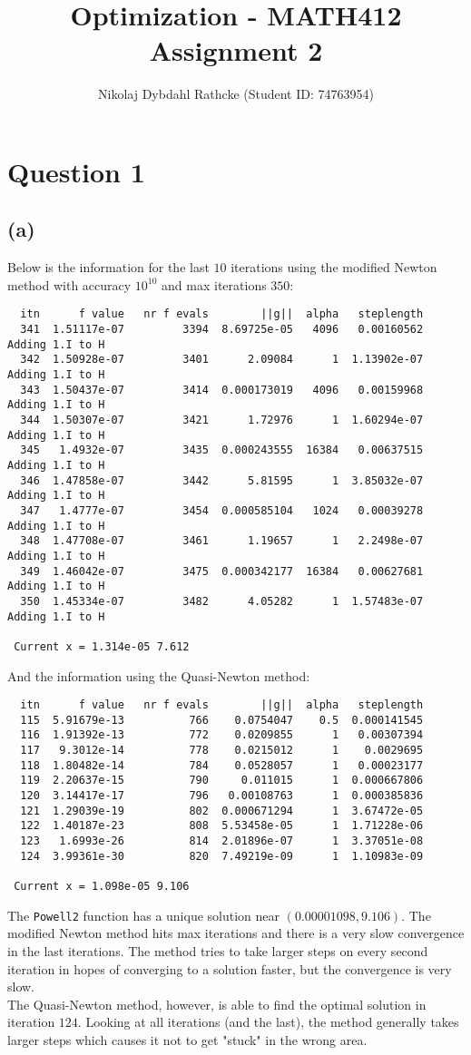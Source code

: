 \documentclass[a4paper, fleqn]{article}
\author{Nikolaj Dybdahl Rathcke (Student ID: 74763954)}
\title{Optimization - MATH412 \\ Assignment 2}
\begin{document}
\maketitle

\section{Question 1}
\subsection{(a)}
Below is the information for the last $10$ iterations using the modified Newton method
with accuracy $10^{10}$ and max iterations $350$:
\begin{verbatim}
  itn      f value   nr f evals        ||g||  alpha   steplength
  341  1.51117e-07         3394  8.69725e-05   4096   0.00160562 Adding 1.I to H
  342  1.50928e-07         3401      2.09084      1  1.13902e-07 Adding 1.I to H
  343  1.50437e-07         3414  0.000173019   4096   0.00159968 Adding 1.I to H
  344  1.50307e-07         3421      1.72976      1  1.60294e-07 Adding 1.I to H
  345   1.4932e-07         3435  0.000243555  16384   0.00637515 Adding 1.I to H
  346  1.47858e-07         3442      5.81595      1  3.85032e-07 Adding 1.I to H
  347   1.4777e-07         3454  0.000585104   1024   0.00039278 Adding 1.I to H
  348  1.47708e-07         3461      1.19657      1   2.2498e-07 Adding 1.I to H
  349  1.46042e-07         3475  0.000342177  16384   0.00627681 Adding 1.I to H
  350  1.45334e-07         3482      4.05282      1  1.57483e-07 Adding 1.I to H

 Current x = 1.314e-05 7.612
\end{verbatim}
And the information using the Quasi-Newton method:
\begin{verbatim}
  itn      f value   nr f evals        ||g||  alpha   steplength
  115  5.91679e-13          766    0.0754047    0.5  0.000141545
  116  1.91392e-13          772    0.0209855      1   0.00307394
  117   9.3012e-14          778    0.0215012      1    0.0029695
  118  1.80482e-14          784    0.0528057      1   0.00023177
  119  2.20637e-15          790     0.011015      1  0.000667806
  120  3.14417e-17          796   0.00108763      1  0.000385836
  121  1.29039e-19          802  0.000671294      1  3.67472e-05
  122  1.40187e-23          808  5.53458e-05      1  1.71228e-06
  123   1.6993e-26          814  2.01896e-07      1  3.37051e-08
  124  3.99361e-30          820  7.49219e-09      1  1.10983e-09

 Current x = 1.098e-05 9.106
\end{verbatim}
The \texttt{Powell2} function has a unique solution near $(0.00001098, 9.106)$. The
modified Newton method hits max iterations and there is a very slow convergence in the
last iterations. The method tries to take larger steps on every second iteration in hopes
of converging to a solution faster, but the convergence is very slow. \\
The Quasi-Newton method, however, is able to find the optimal solution in iteration
$124$. Looking at all iterations (and the last), the method generally takes larger steps
which causes it not to get "stuck" in the wrong area.
\end{document}
